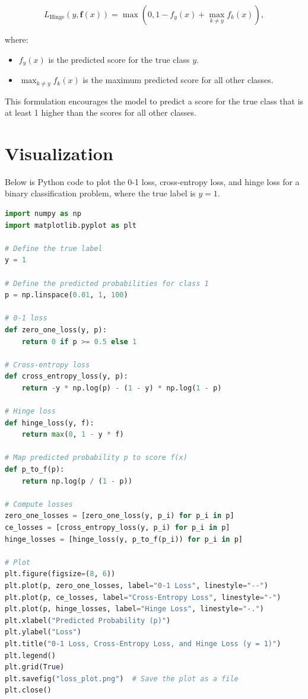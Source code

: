 \begin{notechapter}
\[
L_{\text{Hinge}}(y, \mathbf{f}(x)) = \max\left(0, 1 - f_y(x) + \max_{k \neq y} f_k(x)\right),
\]

where:
\begin{itemize}
    \item \( f_y(x) \) is the predicted score for the true class \( y \).
    \item \( \max_{k \neq y} f_k(x) \) is the maximum predicted score for all 
          other classes.
\end{itemize}

This formulation encourages the model to predict a score for the true 
class that is at least 1 higher than the scores for all other classes.

\section{Visualization}

Below is Python code to plot the 0-1 loss, cross-entropy loss, and 
hinge loss for a binary classification problem, where the true label 
is \( y = 1 \).

\begin{lstlisting}[language=Python]
import numpy as np
import matplotlib.pyplot as plt

# Define the true label
y = 1

# Define the predicted probabilities for class 1
p = np.linspace(0.01, 1, 100)

# 0-1 loss
def zero_one_loss(y, p):
    return 0 if p >= 0.5 else 1

# Cross-entropy loss
def cross_entropy_loss(y, p):
    return -y * np.log(p) - (1 - y) * np.log(1 - p)

# Hinge loss
def hinge_loss(y, f):
    return max(0, 1 - y * f)

# Map predicted probability p to score f(x)
def p_to_f(p):
    return np.log(p / (1 - p))

# Compute losses
zero_one_losses = [zero_one_loss(y, p_i) for p_i in p]
ce_losses = [cross_entropy_loss(y, p_i) for p_i in p]
hinge_losses = [hinge_loss(y, p_to_f(p_i)) for p_i in p]

# Plot
plt.figure(figsize=(8, 6))
plt.plot(p, zero_one_losses, label="0-1 Loss", linestyle="--")
plt.plot(p, ce_losses, label="Cross-Entropy Loss", linestyle="-")
plt.plot(p, hinge_losses, label="Hinge Loss", linestyle="-.")
plt.xlabel("Predicted Probability (p)")
plt.ylabel("Loss")
plt.title("0-1 Loss, Cross-Entropy Loss, and Hinge Loss (y = 1)")
plt.legend()
plt.grid(True)
plt.savefig("loss_plot.png")  # Save the plot as a file
plt.close()
\end{lstlisting}


\end{notechapter}
